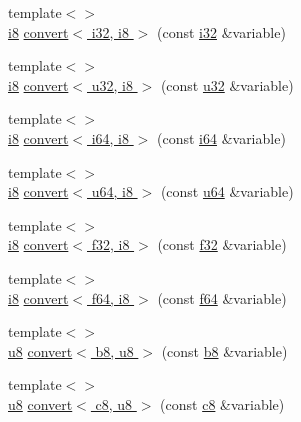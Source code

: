 \begin{DoxyCompactItemize}
\item 
{\footnotesize template$<$$>$ }\\\hyperlink{types_8h_ae3702327b5f47e83b431e22b33da7b58}{i8} \hyperlink{namespacecrap_a140e37b494b7fd2fe5b2aa3ece799fef}{convert$<$ i32, i8 $>$} (const \hyperlink{types_8h_a48d6cd8e4135fb2ff7e7f2dac84089ec}{i32} \&variable)
\item 
{\footnotesize template$<$$>$ }\\\hyperlink{types_8h_ae3702327b5f47e83b431e22b33da7b58}{i8} \hyperlink{namespacecrap_a36dfe8f9d7518a564febc0a65df7b7af}{convert$<$ u32, i8 $>$} (const \hyperlink{types_8h_afaa62991928fb9fb18ff0db62a040aba}{u32} \&variable)
\item 
{\footnotesize template$<$$>$ }\\\hyperlink{types_8h_ae3702327b5f47e83b431e22b33da7b58}{i8} \hyperlink{namespacecrap_ae1e2f06c6e5a3880d1cc91a2c17fccd0}{convert$<$ i64, i8 $>$} (const \hyperlink{types_8h_a85cb35fbe5bf2961d7ad5f26814a91a2}{i64} \&variable)
\item 
{\footnotesize template$<$$>$ }\\\hyperlink{types_8h_ae3702327b5f47e83b431e22b33da7b58}{i8} \hyperlink{namespacecrap_ac6e0de37f02c36d640dcb1c4aee92020}{convert$<$ u64, i8 $>$} (const \hyperlink{types_8h_a3f7e2bcbb0b4c338f3c4f6c937cd4234}{u64} \&variable)
\item 
{\footnotesize template$<$$>$ }\\\hyperlink{types_8h_ae3702327b5f47e83b431e22b33da7b58}{i8} \hyperlink{namespacecrap_a39b437c8e592a2d970fef2847842a6ad}{convert$<$ f32, i8 $>$} (const \hyperlink{types_8h_a154db6eda6a99565cb060a1da4b4c930}{f32} \&variable)
\item 
{\footnotesize template$<$$>$ }\\\hyperlink{types_8h_ae3702327b5f47e83b431e22b33da7b58}{i8} \hyperlink{namespacecrap_a9ec2d8214fd050d3118be46e835120a6}{convert$<$ f64, i8 $>$} (const \hyperlink{types_8h_a76c9f53497f766e57b184bc8a93ab73f}{f64} \&variable)
\item 
{\footnotesize template$<$$>$ }\\\hyperlink{types_8h_a92c50087ca0e64fa93fc59402c55f8ca}{u8} \hyperlink{namespacecrap_aba424b021644612340ad298bfd65caf1}{convert$<$ b8, u8 $>$} (const \hyperlink{types_8h_a74eb47b4ab9e428eab7b91b3b877fa6c}{b8} \&variable)
\item 
{\footnotesize template$<$$>$ }\\\hyperlink{types_8h_a92c50087ca0e64fa93fc59402c55f8ca}{u8} \hyperlink{namespacecrap_a356873ec5863ee8ea890ca237103f1cb}{convert$<$ c8, u8 $>$} (const \hyperlink{types_8h_aa1ba8aac9fcd831012308297336ac74b}{c8} \&variable)

\end{DoxyCompactItemize}
